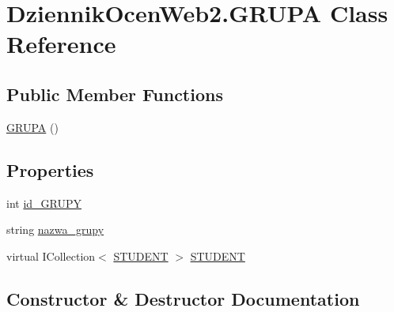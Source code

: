 \hypertarget{class_dziennik_ocen_web2_1_1_g_r_u_p_a}{}\section{Dziennik\+Ocen\+Web2.\+G\+R\+U\+PA Class Reference}
\label{class_dziennik_ocen_web2_1_1_g_r_u_p_a}
\subsection*{Public Member Functions}
\begin{DoxyCompactItemize}
\item 
\hyperlink{class_dziennik_ocen_web2_1_1_g_r_u_p_a_a59d87f0cb1bf4e2be67c497c37ed28b1}{G\+R\+U\+PA} ()
\end{DoxyCompactItemize}
\subsection*{Properties}
\begin{DoxyCompactItemize}
\item 
int \hyperlink{class_dziennik_ocen_web2_1_1_g_r_u_p_a_a88256b43c28c202822d84e0e2ca61eb0}{id\+\_\+\+G\+R\+U\+PY}
\item 
string \hyperlink{class_dziennik_ocen_web2_1_1_g_r_u_p_a_aea3a7c3d2aa3820ec24bd079a8823dbd}{nazwa\+\_\+grupy}
\item 
virtual I\+Collection$<$ \hyperlink{class_dziennik_ocen_web2_1_1_s_t_u_d_e_n_t}{S\+T\+U\+D\+E\+NT} $>$ \hyperlink{class_dziennik_ocen_web2_1_1_g_r_u_p_a_a5814085ba05380474ab502665b53df0a}{S\+T\+U\+D\+E\+NT}
\end{DoxyCompactItemize}


\subsection{Constructor \& Destructor Documentation}
\mbox{\label{class_dziennik_ocen_web2_1_1_g_r_u_p_a_a59d87f0cb1bf4e2be67c497c37ed28b1}} 
